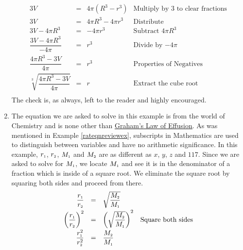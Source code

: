 \begin{ex}
\begin{enumerate}
\[\begin{array}{rclr}
3V & = & 4\pi (R^3 - r^3) &  \text{Multiply by $3$ to clear fractions}\\[2pt]

3V & = & 4\pi R^3 - 4\pi r^3 & \text{Distribute} \\[2pt]

3V - 4\pi R^3 & = & -4 \pi r^3 & \text{Subtract $4 \pi R^3$} \\[2pt]

\dfrac{3V - 4\pi R^3}{-4\pi} & = & r^3 & \text{Divide by $-4\pi$} \\[8pt]

\dfrac{4\pi R^3 - 3V}{4\pi} & = & r^3 & \text{Properties of Negatives} \\[10pt]

\sqrt[3]{\dfrac{4\pi R^3 - 3V}{4\pi}} & = & r & \text{Extract the cube root} \\

\end{array} \] The check is, as always, left to the reader and highly encouraged.

\item  The equation we are asked to solve in this example is from the world of Chemistry and is none other than \href{http://en.wikipedia.org/wiki/Graham's_law}{\underline{Graham's Law of Effusion}}.  As was mentioned in Example \ref{rateqnreviewex}, subscripts in Mathematics are used to distinguish between variables and have no arithmetic significance.  In this example, $r_{\text{\tiny$1$}}$, $r_{\text{\tiny$2$}}$, $M_{\text{\tiny$1$}}$ and $M_{\text{\tiny$2$}}$ are as different as $x$, $y$, $z$ and $117$.  Since we are asked to solve for $M_{\text{\tiny$1$}}$, we locate $M_{\text{\tiny$1$}}$ and see it is in the denominator of a fraction which is inside of a square root.  We eliminate the square root by squaring both sides and proceed from there.  \[ \begin{array}{rclr}

 \dfrac{r_{\text{\tiny$1$}}}{r_{\text{\tiny$2$}}} & = &  \sqrt{\dfrac{M_{\text{\tiny$2$}}}{M_{\text{\tiny$1$}}}} & \\[8pt]

\left(\dfrac{r_{\text{\tiny$1$}}}{r_{\text{\tiny$2$}}}\right)^2 & = & \left(\sqrt{\dfrac{M_{\text{\tiny$2$}}}{M_{\text{\tiny$1$}}}}\right)^2 & \text{Square both sides} \\[8pt]

\dfrac{r_{\text{\tiny$1$}}^2}{r_{\text{\tiny$2$}}^2} & = & \dfrac{M_{\text{\tiny$2$}}}{M_{\text{\tiny$1$}}} & \\[8pt]


\end{array}\]
\end{enumerate}
\end{ex}
